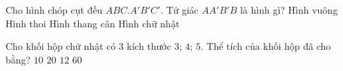 

\begin{ex}%
	Cho hình chóp cụt đều $ABC. A'B'C'$.  Tứ giác $AA'B'B$ là hình gì?
	 \choice
		{Hình  vuông}
		{Hình  thoi}
		{\True  Hình thang cân}
		{Hình chữ  nhật}
\end{ex}

\begin{ex}%
	Cho khối hộp chữ nhật có 3 kích thước $3;\,4;\,5$.  Thể tích của khối hộp đã cho bằng?
	\choice 
		 {$10$}
		 {$20$}
		{$12$} 
		 {\True $60$}
\end{ex}



